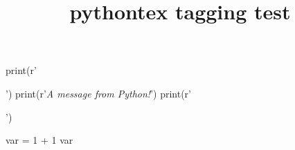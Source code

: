 \documentclass{article}
\title{pythontex tagging test}
\begin{document}

 



\begin{pycode}
print(r'\begin{center}')
print(r'\textit{A message from Python!}')
print(r'\end{center}')
\end{pycode}

\begin{pyconsole}
var = 1 + 1
var
\end{pyconsole}
\end{document}
